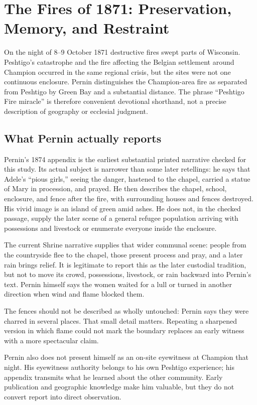 \section{The Fires of 1871: Preservation, Memory, and Restraint}

On the night of 8--9 October 1871 destructive fires swept parts of Wisconsin. Peshtigo's catastrophe and the fire affecting the Belgian settlement around Champion occurred in the same regional crisis, but the sites were not one continuous enclosure. Pernin distinguishes the Champion-area fire as separated from Peshtigo by Green Bay and a substantial distance. The phrase “Peshtigo Fire miracle” is therefore convenient devotional shorthand, not a precise description of geography or ecclesial judgment.

\subsection{What Pernin actually reports}

Pernin's 1874 appendix is the earliest substantial printed narrative checked for this study. Its actual subject is narrower than some later retellings: he says that Adele's “pious girls,” seeing the danger, hastened to the chapel, carried a statue of Mary in procession, and prayed. He then describes the chapel, school, enclosure, and fence after the fire, with surrounding houses and fences destroyed. His vivid image is an island of green amid ashes. He does not, in the checked passage, supply the later scene of a general refugee population arriving with possessions and livestock or enumerate everyone inside the enclosure.

The current Shrine narrative supplies that wider communal scene: people from the countryside flee to the chapel, those present process and pray, and a later rain brings relief. It is legitimate to report this as the later custodial tradition, but not to move its crowd, possessions, livestock, or rain backward into Pernin's text. Pernin himself says the women waited for a lull or turned in another direction when wind and flame blocked them.

The fences should not be described as wholly untouched: Pernin says they were charred in several places. That small detail matters. Repeating a sharpened version in which flame could not mark the boundary replaces an early witness with a more spectacular claim.

Pernin also does not present himself as an on-site eyewitness at Champion that night. His eyewitness authority belongs to his own Peshtigo experience; his appendix transmits what he learned about the other community. Early publication and geographic knowledge make him valuable, but they do not convert report into direct observation.


